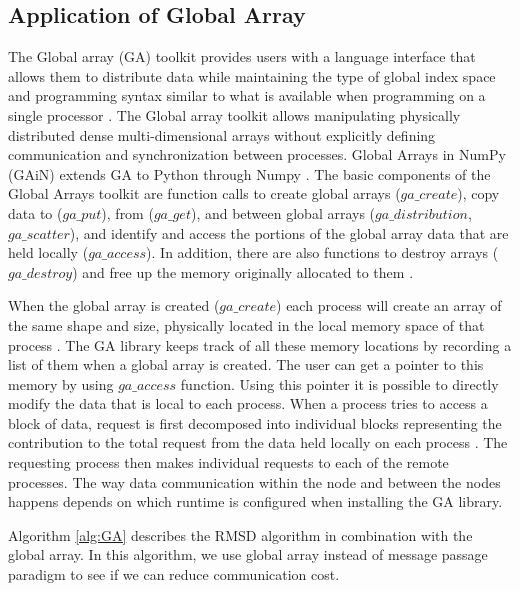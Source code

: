 \subsection{Application of Global Array}
The Global array (GA) toolkit provides users with a language interface that allows them to distribute data while maintaining the type of global index space and programming syntax similar to what is available when programming on a single processor \cite{GA}. The Global array toolkit allows manipulating physically distributed dense multi-dimensional arrays without explicitly defining communication and synchronization between processes.
Global Arrays in NumPy (GAiN) extends GA to Python through Numpy \cite{GAiN}. 
The basic components of the Global Arrays toolkit are function calls to create global arrays ($ga\_create$), copy data to ($ga\_put$), from ($ga\_get$), and between global arrays ($ga\_distribution$, $ga\_scatter$), and identify and access the portions of the global array data that are held locally ($ga\_access$). 
In addition, there are also functions to destroy arrays ($ga\_destroy$) and free up the memory originally allocated to them \cite{GAiN}.

When the global array is created ($ga\_create$) each process will create an array of the same shape and size, physically located in the local memory space of that process \cite{GA}. 
The GA library keeps track of all these memory locations by recording a list of them when a global array is created. 
The user can get a pointer to this memory by using $ga\_access$ function.
Using this pointer it is possible to directly modify the data that is local to each process.
When a process tries to access a block of data, request is first decomposed into individual blocks representing the contribution to the total request from the data held locally on each process \cite{PNNL:2018}. 
The requesting process then makes individual requests to each of the remote processes. 
The way data communication within the node and between the nodes happens depends on which runtime is configured when installing the GA library.

Algorithm \ref{alg:GA} describes the RMSD algorithm in combination with the global array.
In this algorithm, we use global array instead of message passage paradigm to see if we can reduce communication cost. 

